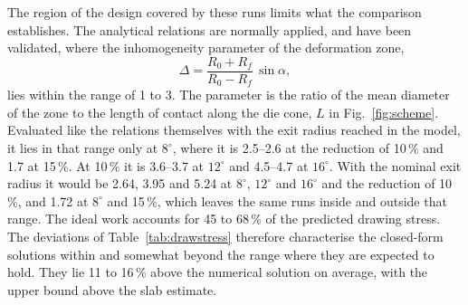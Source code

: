 The region of the design covered by these runs limits what the comparison establishes. The
analytical relations are normally applied, and have been validated, where the inhomogeneity
parameter of the deformation zone,
\begin{equation}
\Delta = \frac{R_0+R_f}{R_0-R_f}\,\sin\alpha,
\label{eq:delta}
\end{equation}
lies within the range of 1 to 3. The parameter is the ratio of the mean diameter of the zone to
the length of contact along the die cone, $L$ in Fig.~\ref{fig:scheme}. Evaluated like the
relations themselves with the exit radius reached in the model, it lies in that range only at
$8^\circ$, where it is
2.5--2.6 at the reduction of 10\,\% and 1.7 at 15\,\%. At 10\,\% it is 3.6--3.7 at $12^\circ$
and 4.5--4.7 at $16^\circ$. With the nominal exit radius it would be 2.64, 3.95 and 5.24 at
$8^\circ$, $12^\circ$ and $16^\circ$ and the reduction of 10\,\%, and 1.72 at $8^\circ$ and 15\,\%,
which leaves the same runs inside and outside that range.
The ideal work accounts for 45 to 68\,\% of the predicted drawing
stress. The deviations of Table~\ref{tab:drawstress} therefore characterise the closed-form
solutions within and somewhat beyond the range where they are expected to hold. They lie 11 to
16\,\% above the numerical solution on average, with the upper bound above the slab estimate.

